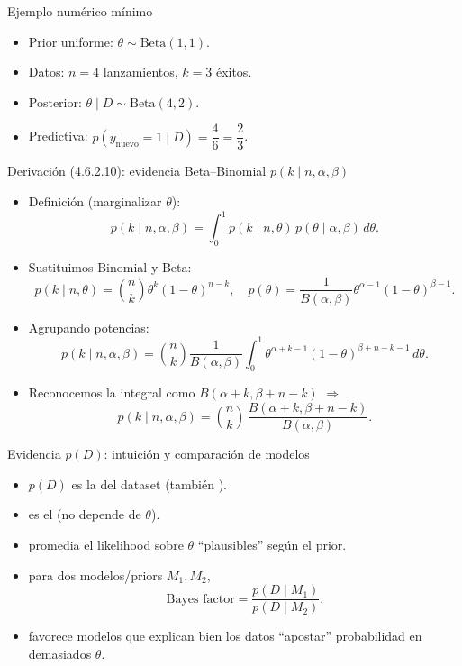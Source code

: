 \begin{frame}{Ejemplo numérico mínimo}
\begin{itemize}
  \item Prior uniforme: \(\theta\sim \mathrm{Beta}(1,1)\).
  \item Datos: \(n=4\) lanzamientos, \(k=3\) éxitos.
  \item Posterior: \(\theta\mid D\sim \mathrm{Beta}(4,2)\).
  \item Predictiva: \(p(y_{\text{nuevo}}=1\mid D)=\dfrac{4}{6}=\dfrac{2}{3}\).
\end{itemize}
\end{frame}

\begin{frame}{Derivación (4.6.2.10): evidencia Beta--Binomial \(p(k\mid n,\alpha,\beta)\)}
\begin{itemize}
  \item Definición (marginalizar \(\theta\)):
  \[
    p(k\mid n,\alpha,\beta)=\int_0^1 p(k\mid n,\theta)\,p(\theta\mid\alpha,\beta)\,d\theta.
  \]
  \item Sustituimos Binomial y Beta:
  \[
    p(k\mid n,\theta)=\binom{n}{k}\theta^k(1-\theta)^{n-k},
    \quad
    p(\theta)=\frac{1}{B(\alpha,\beta)}\theta^{\alpha-1}(1-\theta)^{\beta-1}.
  \]
  \item Agrupando potencias:
  \[
    p(k\mid n,\alpha,\beta)=\binom{n}{k}\frac{1}{B(\alpha,\beta)}
    \int_0^1 \theta^{\alpha+k-1}(1-\theta)^{\beta+n-k-1}\,d\theta.
  \]
  \item Reconocemos la integral como \(B(\alpha+k,\beta+n-k)\) \(\Rightarrow\)
  \[
    p(k\mid n,\alpha,\beta)=\binom{n}{k}\,\frac{B(\alpha+k,\beta+n-k)}{B(\alpha,\beta)}.
  \]
\end{itemize}
\end{frame}

\begin{frame}{Evidencia \(p(D)\): intuición y comparación de modelos}
\begin{itemize}
  \item {} \(p(D)\) es la  del dataset (también ).
  \item {} es el  (no depende de \(\theta\)).
  \item {} promedia el likelihood sobre \(\theta\) “plausibles” según el prior.
  \item {} para dos modelos/priors \(M_1,M_2\),
  \[
    \text{Bayes factor}=\frac{p(D\mid M_1)}{p(D\mid M_2)}.
  \]
  \item {} favorece modelos que explican bien los datos  “apostar” probabilidad en demasiados \(\theta\).
\end{itemize}
\end{frame}

